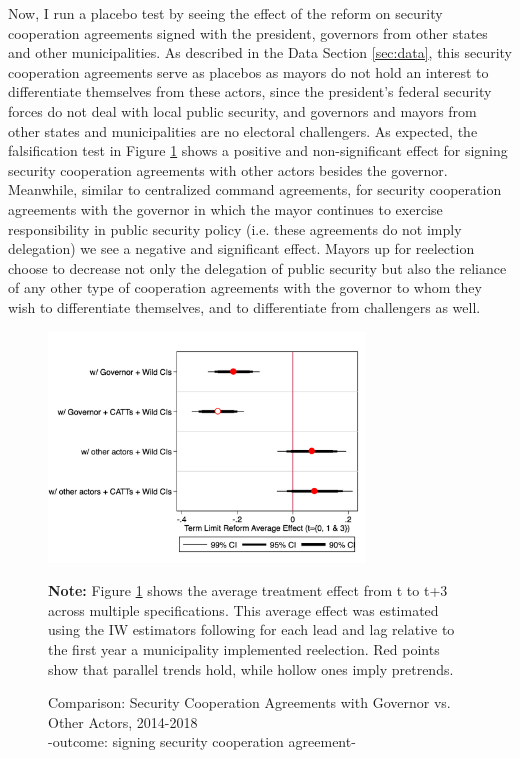 Now, I run a placebo test by seeing the effect of the reform on security cooperation agreements signed with the president, governors from other states and other municipalities. As described in the Data Section \ref{sec:data}, this security cooperation agreements serve as placebos as mayors do not hold an interest to differentiate themselves from these actors,  since the president's federal security forces do not deal with local public security, and governors and mayors from other states and municipalities are no electoral challengers. As expected, the falsification test in Figure \ref{fig:comparison_fed_estatal} shows a positive and non-significant effect for signing security cooperation agreements with other actors besides the governor. Meanwhile, similar to centralized command agreements, for security cooperation agreements with the governor in which the mayor continues to exercise responsibility in public security policy (i.e. these agreements do not imply delegation) we see a negative and significant effect. Mayors up for reelection choose to decrease not only the delegation of public security but also the reliance of any other type of cooperation agreements with the governor to whom they wish to differentiate themselves, and to differentiate from challengers as well.    
  
 \begin{figure}[h]   
\centering
 \caption{Comparison: Security Cooperation Agreements with Governor vs. Other Actors, 2014-2018 \\ -outcome: signing security cooperation agreement-}
 \label{fig:comparison_fed_estatal}
\includegraphics[width=0.75\textwidth]{Figures/average_effects_comparisonfedest.png}
       \captionsetup{justification=centering}
       
 \textbf{Note:} Figure \ref{fig:comparison_fed_estatal} shows the average treatment effect from t to t+3 across multiple specifications. This average effect was estimated using the IW estimators following \citet{abraham_sun_2020} for each lead and lag relative to the first year a municipality implemented reelection. Red points show that parallel trends hold, while hollow ones imply pretrends. 
\end{figure}   

